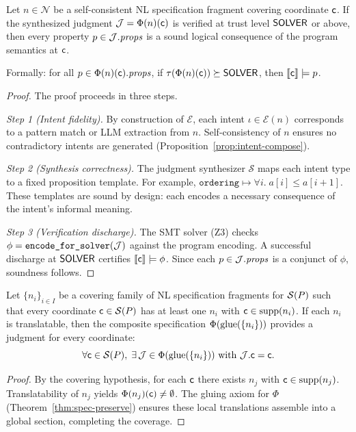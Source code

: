 \documentclass[11pt]{article}
\newcommand{\EncodeForSolver}{\texttt{encode\_for\_solver}}
\newcommand{\NLSpec}{\mathcal{N}}
\newcommand{\SpecFunctor}{\Phi}
\begin{document}
\begin{theorem}\label{thm:soundness}
Let $n \in \NLSpec$ be a self-consistent NL specification fragment
covering coordinate $\mathsf{c}$.  If the synthesized judgment
$\J = \SpecFunctor(n)(\coord)$ is verified at trust level
$\mathsf{SOLVER}$ or above, then every property $p \in \mathcal{J}.\mathit{props}$
is a sound logical consequence of the program semantics at $\mathsf{c}$.

Formally: for all $p \in \SpecFunctor(n)(\coord).\mathit{props}$,
if $\tau(\SpecFunctor(n)(\coord)) \succeq \Tsolver$, then
$\llbracket \mathsf{c} \rrbracket \models p$.
\end{theorem}

\begin{proof}
The proof proceeds in three steps.

\emph{Step 1 (Intent fidelity).}  By construction of $\mathcal{E}$,
each intent $\iota \in \mathcal{E}(n)$ corresponds to a pattern match
or LLM extraction from $n$.  Self-consistency of $n$ ensures no
contradictory intents are generated
(Proposition~\ref{prop:intent-compose}).

\emph{Step 2 (Synthesis correctness).}  The judgment synthesizer
$\mathcal{S}$ maps each intent type to a fixed proposition template.
For example, $\texttt{ordering} \mapsto \forall i.\; a[i] \leq
a[i+1]$.  These templates are sound by design: each encodes a
necessary consequence of the intent's informal meaning.

\emph{Step 3 (Verification discharge).}  The SMT solver (Z3) checks
$\phi = \EncodeForSolver(\J)$ against the program encoding.  A
successful discharge at $\mathsf{SOLVER}$ certifies
$\llbracket \mathsf{c} \rrbracket \models \phi$.  Since each $p \in
\mathcal{J}.\mathit{props}$ is a conjunct of $\phi$, soundness follows.
\end{proof}

\begin{theorem}\label{thm:coverage}
Let $\{n_i\}_{i \in I}$ be a covering family of NL specification
fragments for $\mathcal{S}(P)$ such that every coordinate $\mathsf{c} \in
\mathcal{S}(P)$ has at least one $n_i$ with $\mathsf{c} \in
\mathrm{supp}(n_i)$.  If each $n_i$ is translatable, then the
composite specification $\SpecFunctor(\glue(\{n_i\}))$ provides a
judgment for every coordinate:
\[
\forall \coord \in \Site(P),\; \exists\, \J \in
\SpecFunctor(\glue(\{n_i\})) \text{ with }
\J.\coord = \coord.
\]
\end{theorem}

\begin{proof}
By the covering hypothesis, for each $\mathsf{c}$ there exists $n_j$ with
$\mathsf{c} \in \mathrm{supp}(n_j)$.  Translatability of $n_j$ yields
$\SpecFunctor(n_j)(\coord) \neq \emptyset$.  The gluing axiom for
$\SpecFunctor$ (Theorem~\ref{thm:spec-preserve}) ensures these local
translations assemble into a global section, completing the coverage.
\end{proof}
\end{document}
